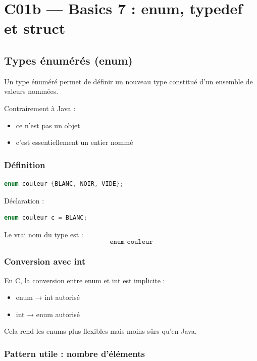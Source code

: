 \section{C01b — Basics 7 : enum, typedef et struct}

\subsection{Types énumérés (enum)}

Un type énuméré permet de définir un nouveau type constitué d’un ensemble
de valeurs nommées.

Contrairement à Java :
\begin{itemize}
    \item ce n’est pas un objet
    \item c’est essentiellement un entier nommé
\end{itemize}

\subsubsection{Définition}

\begin{lstlisting}[language=C]
enum couleur {BLANC, NOIR, VIDE};
\end{lstlisting}

Déclaration :

\begin{lstlisting}[language=C]
enum couleur c = BLANC;
\end{lstlisting}

Le vrai nom du type est :
\[
\texttt{enum couleur}
\]

\subsubsection{Conversion avec int}

En C, la conversion entre enum et int est implicite :

\begin{itemize}
    \item enum → int autorisé
    \item int → enum autorisé
\end{itemize}

Cela rend les enums plus flexibles mais moins sûrs qu’en Java.

\subsubsection{Pattern utile : nombre d’éléments}

